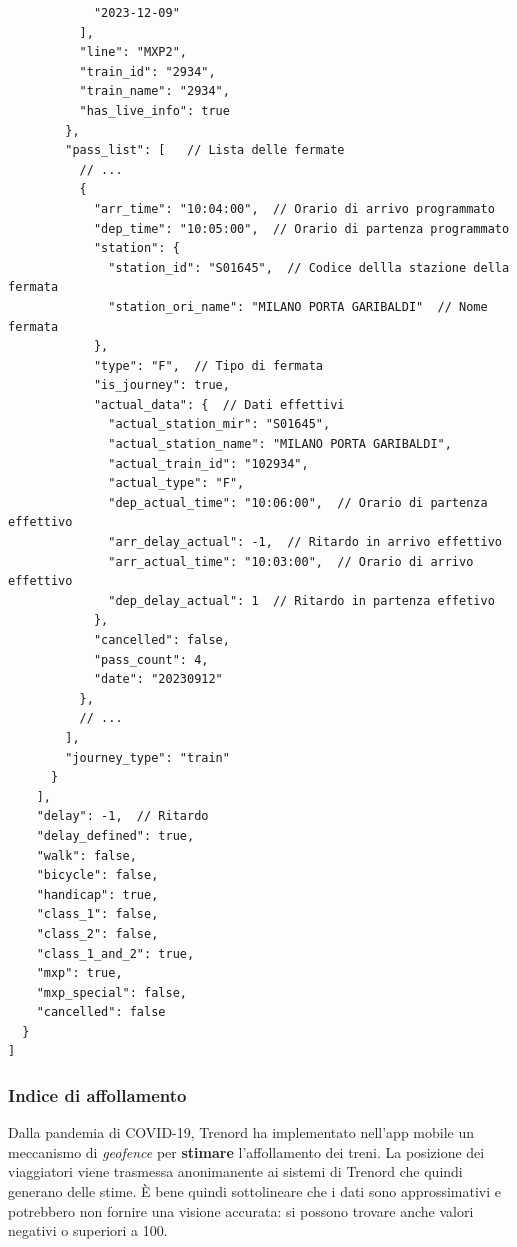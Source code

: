 \documentclass[12pt,italian]{report}
\begin{document}
\begin{verbatim}
            "2023-12-09"
          ],
          "line": "MXP2",
          "train_id": "2934",
          "train_name": "2934",
          "has_live_info": true
        },
        "pass_list": [   // Lista delle fermate
          // ...
          {
            "arr_time": "10:04:00",  // Orario di arrivo programmato
            "dep_time": "10:05:00",  // Orario di partenza programmato
            "station": {
              "station_id": "S01645",  // Codice dellla stazione della fermata
              "station_ori_name": "MILANO PORTA GARIBALDI"  // Nome fermata
            },
            "type": "F",  // Tipo di fermata
            "is_journey": true,
            "actual_data": {  // Dati effettivi
              "actual_station_mir": "S01645",
              "actual_station_name": "MILANO PORTA GARIBALDI",
              "actual_train_id": "102934",
              "actual_type": "F",
              "dep_actual_time": "10:06:00",  // Orario di partenza effettivo
              "arr_delay_actual": -1,  // Ritardo in arrivo effettivo
              "arr_actual_time": "10:03:00",  // Orario di arrivo effettivo
              "dep_delay_actual": 1  // Ritardo in partenza effetivo
            },
            "cancelled": false,
            "pass_count": 4,
            "date": "20230912"
          },
          // ...
        ],
        "journey_type": "train"
      }
    ],
    "delay": -1,  // Ritardo
    "delay_defined": true,
    "walk": false,
    "bicycle": false,
    "handicap": true,
    "class_1": false,
    "class_2": false,
    "class_1_and_2": true,
    "mxp": true,
    "mxp_special": false,
    "cancelled": false
  }
]
\end{verbatim}

\subsubsection{Indice di affollamento}

Dalla pandemia di COVID-19, Trenord ha implementato nell'app mobile un
meccanismo di \textit{geofence} per \textbf{stimare} l'affollamento
dei treni.  La posizione dei viaggiatori viene trasmessa anonimanente
ai sistemi di Trenord che quindi generano delle stime.  È bene quindi
sottolineare che i dati sono approssimativi e potrebbero non fornire
una visione accurata: si possono trovare anche valori negativi o
superiori a 100.
\end{document}
